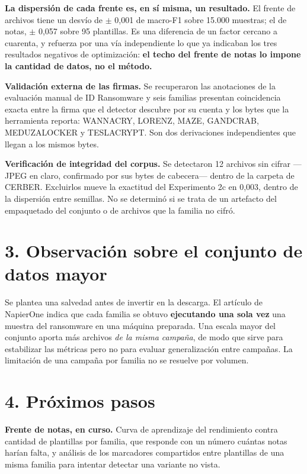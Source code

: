 \documentclass[11pt,a4paper]{article}
\begin{document}
\textbf{La dispersión de cada frente es, en sí misma, un resultado.} El frente de archivos
tiene un desvío de $\pm$ 0,001 de macro-F1 sobre 15.000 muestras; el de notas, $\pm$ 0,057
sobre 95 plantillas. Es una diferencia de un factor cercano a cuarenta, y refuerza por una vía
independiente lo que ya indicaban los tres resultados negativos de optimización: \textbf{el
techo del frente de notas lo impone la cantidad de datos, no el método.}

\textbf{Validación externa de las firmas.} Se recuperaron las anotaciones de la evaluación
manual de ID Ransomware y seis familias presentan coincidencia exacta entre la firma que el
detector descubre por su cuenta y los bytes que la herramienta reporta: WANNACRY, LORENZ, MAZE,
GANDCRAB, MEDUZALOCKER y TESLACRYPT. Son dos derivaciones independientes que llegan a los
mismos bytes.

\textbf{Verificación de integridad del corpus.} Se detectaron 12 archivos sin cifrar ---JPEG en
claro, confirmado por sus bytes de cabecera--- dentro de la carpeta de CERBER. Excluirlos mueve
la exactitud del Experimento 2c en 0,003, dentro de la dispersión entre semillas. No se
determinó si se trata de un artefacto del empaquetado del conjunto o de archivos que la familia
no cifró.

\section*{3. Observación sobre el conjunto de datos mayor}

Se plantea una salvedad antes de invertir en la descarga. El artículo de NapierOne indica que
cada familia se obtuvo \textbf{ejecutando una sola vez} una muestra del ransomware en una
máquina preparada. Una escala mayor del conjunto aporta más archivos \emph{de la misma
campaña}, de modo que sirve para estabilizar las métricas pero no para evaluar generalización
entre campañas. La limitación de una campaña por familia no se resuelve por volumen.

\section*{4. Próximos pasos}

\textbf{Frente de notas, en curso.} Curva de aprendizaje del rendimiento contra cantidad de
plantillas por familia, que responde con un número cuántas notas harían falta, y análisis de los
marcadores compartidos entre plantillas de una misma familia para intentar detectar una variante
no vista.
\end{document}
